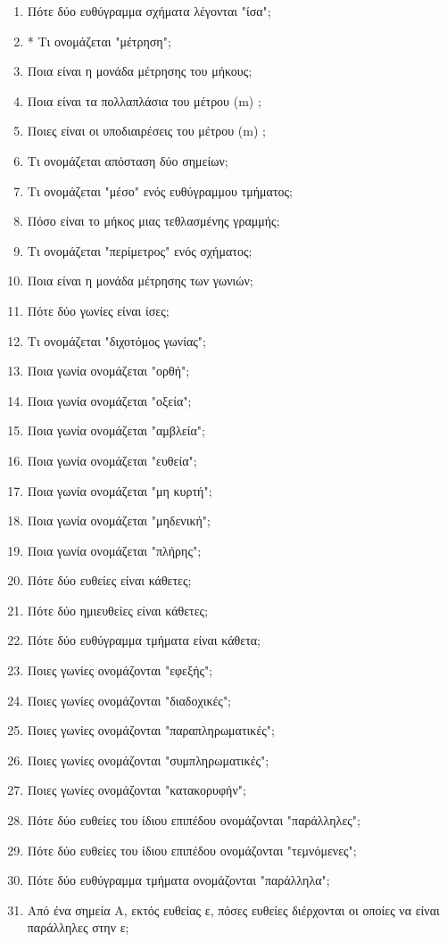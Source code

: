 \documentclass[a4paper,11pt]{report}
\begin{document}
\begin{enumerate}
\item Πότε δύο ευθύγραμμα σχήματα λέγονται "ίσα";
\item * Τι ονομάζεται "μέτρηση";
\item Ποια είναι η μονάδα μέτρησης του μήκους;
\item Ποια είναι τα πολλαπλάσια του μέτρου (m) ;
\item Ποιες είναι οι υποδιαιρέσεις του μέτρου (m) ;
\item Τι ονομάζεται απόσταση δύο σημείων; 
\item Τι ονομάζεται "μέσο" ενός ευθύγραμμου τμήματος;
\item Πόσο είναι το μήκος μιας τεθλασμένης γραμμής;
\item Τι ονομάζεται "περίμετρος" ενός σχήματος;
\item Ποια είναι η μονάδα μέτρησης των γωνιών;
\item Πότε δύο γωνίες είναι ίσες;
\item Τι ονομάζεται "διχοτόμος γωνίας"; 
\item Ποια γωνία ονομάζεται "ορθή";
\item Ποια γωνία ονομάζεται "οξεία";
\item Ποια γωνία ονομάζεται "αμβλεία";
\item Ποια γωνία ονομάζεται "ευθεία";
\item Ποια γωνία ονομάζεται "μη κυρτή";
\item Ποια γωνία ονομάζεται "μηδενική";
\item Ποια γωνία ονομάζεται "πλήρης";
\item Πότε δύο ευθείες είναι κάθετες;
\item Πότε δύο ημιευθείες είναι κάθετες;
\item Πότε δύο ευθύγραμμα τμήματα είναι κάθετα;
\item Ποιες γωνίες ονομάζονται "εφεξής";
\item Ποιες γωνίες ονομάζονται "διαδοχικές";
\item Ποιες γωνίες ονομάζονται "παραπληρωματικές";
\item Ποιες γωνίες ονομάζονται "συμπληρωματικές";
\item Ποιες γωνίες ονομάζονται "κατακορυφήν";
\item Πότε δύο ευθείες του ίδιου επιπέδου ονομάζονται "παράλληλες";
\item Πότε δύο ευθείες του ίδιου επιπέδου ονομάζονται "τεμνόμενες";
\item Πότε δύο ευθύγραμμα τμήματα ονομάζονται "παράλληλα";
\item Από ένα σημεία Α, εκτός ευθείας ε, πόσες ευθείες διέρχονται οι οποίες να είναι παράλληλες στην ε;

\end{enumerate}
\end{document}
